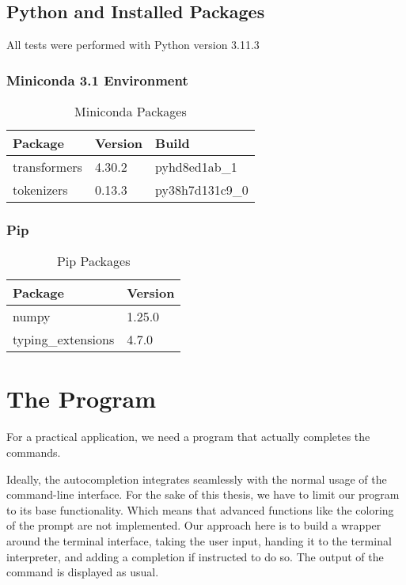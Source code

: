 
\subsection{Python and Installed Packages}
All tests were performed with Python version  3.11.3
\subsubsection{Miniconda 3.1 Environment}

\begin{table}[h]
\centering
\caption{Miniconda Packages}
\begin{tabular}{|l|l|l|}
\hline
Package & Version & Build \\
\hline
\hline
transformers & 4.30.2 & pyhd8ed1ab\_1 \\
\hline
tokenizers & 0.13.3 & py38h7d131c9\_0 \\
\hline
\end{tabular}
\end{table}

\subsubsection{Pip}

\begin{table}[h]
\centering
\caption{Pip Packages}
\begin{tabular}{|l|l|}
\hline
Package & Version \\
\hline
\hline
numpy & 1.25.0 \\
\hline
typing\_extensions & 4.7.0 \\
\hline
\end{tabular}
\end{table}











\section{The Program}

For a practical application, we need a program that actually completes the commands.

Ideally, the autocompletion integrates seamlessly with the normal usage of the command-line interface. For the sake of this thesis, we have to limit our program to its base functionality. Which means that advanced functions like the coloring of the prompt are not implemented. Our approach here is to build a wrapper around the terminal interface, taking the user input, handing it to the terminal interpreter, and adding a completion if instructed to do so. The output of the command is displayed as usual.



